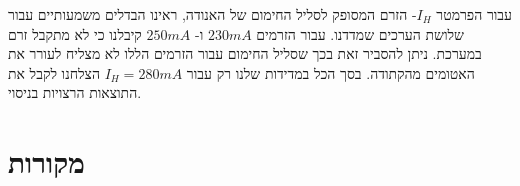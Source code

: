 \documentclass{article}
\begin{document}
עבור הפרמטר 
$I_H$-
הזרם המסופק לסליל החימום של האנודה,
ראינו הבדלים משמעותיים עבור שלושת הערכים שמדדנו.
עבור הזרמים
$230 mA$
ו-
$250 mA$
קיבלנו כי לא מתקבל זרם במערכת.
ניתן להסביר זאת בכך שסליל החימום עבור הזרמים הללו לא מצליח לעורר את האטומים מהקתודה.
בסך הכל במדידות שלנו רק עבור
$I_H = 280 mA$
הצלחנו לקבל את התוצאות הרצויות בניסוי.



\section{מקורות}

\begin{english}
\printbibliography[heading=none]
\end{english}
\end{document}
